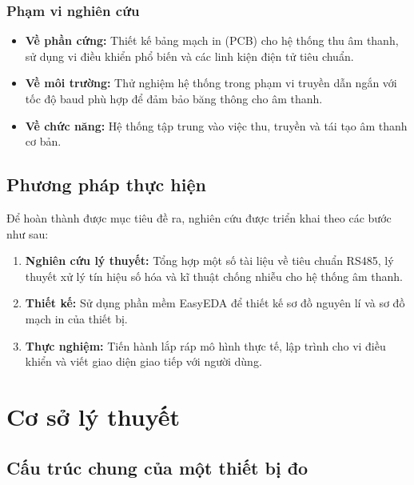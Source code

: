 \documentclass[a4paper]{report}
\begin{document}
\subsection{Phạm vi nghiên cứu}
\begin{itemize}
    \item \textbf{Về phần cứng:} Thiết kế bảng mạch in (PCB) cho hệ thống thu âm thanh, sử dụng vi điều khiển phổ biến và các linh kiện điện tử tiêu chuẩn.
    \item \textbf{Về môi trường:} Thử nghiệm hệ thống trong phạm vi truyền dẫn ngắn với tốc độ baud phù hợp để đảm bảo băng thông cho âm thanh.
    \item \textbf{Về chức năng:} Hệ thống tập trung vào việc thu, truyền và tái tạo âm thanh cơ bản.
\end{itemize}

\section{Phương pháp thực hiện}
Để hoàn thành được mục tiêu đề ra, nghiên cứu được triển khai theo các bước như sau:
\begin{enumerate}
    \item \textbf{Nghiên cứu lý thuyết:} Tổng hợp một số tài liệu về tiêu chuẩn RS485, lý thuyết xử lý tín hiệu số hóa và kĩ thuật chống nhiễu cho hệ thống âm thanh.
    \item \textbf{Thiết kế:} Sử dụng phần mềm EasyEDA để thiết kế sơ đồ nguyên lí và sơ đồ mạch in của thiết bị.
    \item \textbf{Thực nghiệm:} Tiến hành lắp ráp mô hình thực tế, lập trình cho vi điều khiển và viết giao diện giao tiếp với người dùng.
\end{enumerate}

\chapter{Cơ sở lý thuyết}

\section{Cấu trúc chung của một thiết bị đo}

\ 
\end{document}
